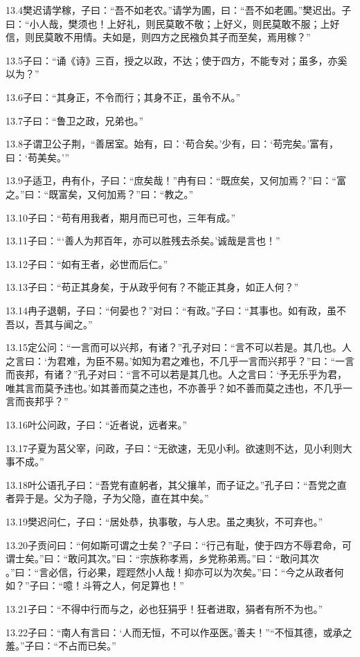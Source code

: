 \documentclass[a4paper,12pt,UTF8,twoside]{ctexbook}
\begin{document}
13.4樊迟请学稼，子曰：“吾不如老农。”请学为圃，曰：“吾不如老圃。”樊迟出。子曰：“小人哉，樊须也！上好礼，则民莫敢不敬；上好义，则民莫敢不服；上好信，则民莫敢不用情。夫如是，则四方之民襁负其子而至矣，焉用稼？”

13.5子曰：“诵《诗》三百，授之以政，不达；使于四方，不能专对；虽多，亦奚以为？”

13.6子曰：“其身正，不令而行；其身不正，虽令不从。”

13.7子曰：“鲁卫之政，兄弟也。”

13.8子谓卫公子荆，“善居室。始有，曰：‘苟合矣。’少有，曰：‘苟完矣。’富有，曰：‘苟美矣。’”

13.9子适卫，冉有仆，子曰：“庶矣哉！”冉有曰：“既庶矣，又何加焉？”曰：“富之。”曰：“既富矣，又何加焉？”曰：“教之。”

13.10子曰：“苟有用我者，期月而已可也，三年有成。”

13.11子曰：“‘善人为邦百年，亦可以胜残去杀矣。’诚哉是言也！”

13.12子曰：“如有王者，必世而后仁。”

13.13子曰：“苟正其身矣，于从政乎何有？不能正其身，如正人何？”

13.14冉子退朝，子曰：“何晏也？”对曰：“有政。”子曰：“其事也。如有政，虽不吾以，吾其与闻之。”

13.15定公问：“一言而可以兴邦，有诸？”孔子对曰：“言不可以若是。其几也。人之言曰：‘为君难，为臣不易。’如知为君之难也，不几乎一言而兴邦乎？”曰：“一言而丧邦，有诸？”孔子对曰：“言不可以若是其几也。人之言曰：‘予无乐乎为君，唯其言而莫予违也。’如其善而莫之违也，不亦善乎？如不善而莫之违也，不几乎一言而丧邦乎？”

13.16叶公问政，子曰：“近者说，远者来。”

13.17子夏为莒父宰，问政，子曰：“无欲速，无见小利。欲速则不达，见小利则大事不成。”

13.18叶公语孔子曰：“吾党有直躬者，其父攘羊，而子证之。”孔子曰：“吾党之直者异于是。父为子隐，子为父隐，直在其中矣。”

13.19樊迟问仁，子曰：“居处恭，执事敬，与人忠。虽之夷狄，不可弃也。”

13.20子贡问曰：“何如斯可谓之士矣？”子曰：“行己有耻，使于四方不辱君命，可谓士矣。”曰：“敢问其次。”曰：“宗族称孝焉，乡党称弟焉。”曰：“敢问其次
。”曰：“言必信，行必果，踁踁然小人哉！抑亦可以为次矣。”曰：“今之从政者何如？”子曰：“噫！斗筲之人，何足算也！”

13.21子曰：“不得中行而与之，必也狂狷乎！狂者进取，狷者有所不为也。”

13.22子曰：“南人有言曰：‘人而无恒，不可以作巫医。’善夫！”“不恒其德，或承之羞。”子曰：“不占而已矣。”
\end{document}
